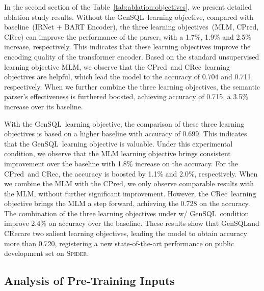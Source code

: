 \documentclass[letterpaper]{article} \usepackage{aaai21}  \usepackage{times}  \usepackage{helvet} \usepackage{courier}  \usepackage[hyphens]{url}  \usepackage{graphicx} \usepackage{booktabs}
\newcommand{\colpred}{CPred}
\newcommand{\colrec}{CRec}
\newcommand{\gensql}{GenSQL}
\begin{document}
In the second section of the Table~\ref{tab:ablation:objectives}, we present detailed ablation study results. Without the \gensql~learning objective, compared with baseline~(IRNet + BART Encoder), the three learning objectives~(MLM, \colpred, \colrec) can improve the performance of the parser, with a 1.7\%, 1.9\% and 2.5\% increase, respectively.
This indicates that these learning objectives improve the encoding quality of the transformer encoder.
Based on the standard unsupervised learning objective MLM, we observe that the \colpred~and \colrec~learning objectives are helpful, 
which lead the model to the accuracy of 0.704 and 0.711, respectively.
When we further combine the three learning objectives, the semantic parser's effectiveness is furthered boosted, achieving accuracy of 0.715, a 3.5\% increase over its baseline.

With the \gensql~learning objective, the comparison of these three learning objectives is based on a higher baseline with accuracy of 0.699.
This indicates that the \gensql~learning objective is valuable.
Under this experimental condition, we observe that the MLM learning objective brings consistent improvement over the baseline with 1.8\% increase on the accuracy.
For the \colpred~and \colrec, the accuracy is boosted by 1.1\% and 2.0\%, respectively.
When we combine the MLM with the \colpred, we only observe comparable results with the MLM, without further significant improvement.
However, the \colrec~learning objective brings the MLM a step forward, achieving the 0.728 on the accuracy.
The combination of the three learning objectives under w/ \gensql~condition improve 2.4\% on accuracy over the baseline.
These results show that \gensql and \colrec are two salient learning objectives, leading the model to obtain accuracy more than 0.720, registering a new state-of-the-art performance on public development set on \textsc{Spider}.

\subsection{Analysis of Pre-Training Inputs}
\end{document}
